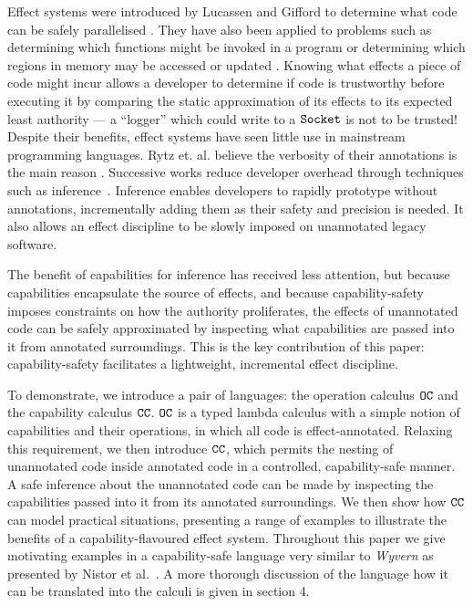 Effect systems were introduced by Lucassen and Gifford to determine what code can be safely parallelised \cite{lucassen88}. They have also been applied to problems such as determining which functions might be invoked in a program \cite{tang94} or determining which regions in memory may be accessed or updated \cite{talpin94}. Knowing what effects a piece of code might incur allows a developer to determine if code is trustworthy before executing it by comparing the static approximation of its effects to its expected least authority --- a ``logger'' which could write to a $\mathtt{Socket}$ is not to be trusted! Despite their benefits, effect systems have seen little use in mainstream programming languages. Rytz et. al. believe the verbosity of their annotations is the main reason \citep{rytz12}. Successive works reduce developer overhead through techniques such as inference~\cite{koka14}. Inference enables developers to rapidly prototype without annotations, incrementally adding them as their safety and precision is needed. It also allows an effect discipline to be slowly imposed on unannotated legacy software.

The benefit of capabilities for inference has received less attention, but because capabilities encapsulate the source of effects, and because capability-safety imposes constraints on how the authority proliferates, the effects of unannotated code can be safely approximated by inspecting what capabilities are passed into it from annotated surroundings. This is the key contribution of this paper: capability-safety facilitates a lightweight, incremental effect discipline.

To demonstrate, we introduce a pair of languages: the operation calculus $\mathtt{OC}$ and the capability calculus $\mathtt{CC}$. $\mathtt{OC}$ is a typed lambda calculus with a simple notion of capabilities and their operations, in which all code is effect-annotated. Relaxing this requirement, we then introduce $\mathtt{CC}$, which permits the nesting of unannotated code inside annotated code in a controlled, capability-safe manner. A safe inference about the unannotated code can be made by inspecting the capabilities passed into it from its annotated surroundings. We then show how $\mathtt{CC}$ can model practical situations, presenting a range of examples to illustrate the benefits of a capability-flavoured effect system. Throughout this paper we give motivating examples in a capability-safe language very similar to \textit{Wyvern} as presented by Nistor et al.~\cite{nistor13}. A more thorough discussion of the language how it can be translated into the calculi is given in section 4.